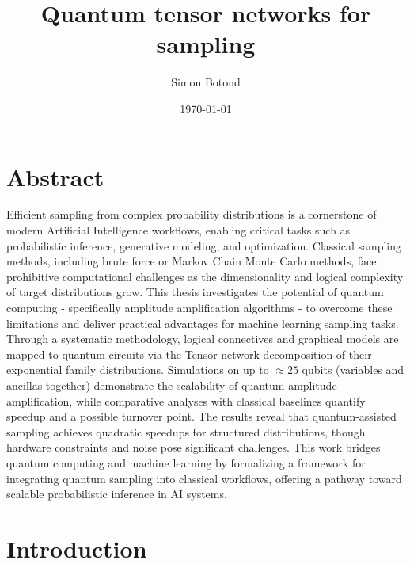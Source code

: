 \documentclass[encoding=utf8,british]{tumphthesis}
\title{Quantum tensor networks for sampling}
\author{Simon Botond}
\date{\today}
\begin{document}

\frontmatter
\maketitle


\mainmatter

\chapter*{Abstract}

Efficient sampling from complex probability distributions is a cornerstone of modern Artificial Intelligence workflows, enabling 
critical tasks such as probabilistic inference, generative modeling, and optimization. Classical sampling methods, 
including brute force or Markov Chain Monte Carlo methods, face prohibitive computational challenges as the 
dimensionality and logical complexity of target distributions grow. This thesis investigates the potential of 
quantum computing - specifically amplitude amplification algorithms - to overcome these limitations and deliver practical 
advantages for machine learning sampling tasks. Through a systematic methodology, logical connectives and graphical 
models are mapped to quantum circuits via the Tensor network decomposition of their exponential family distributions.
Simulations on up to $\approx 25$ qubits (variables and ancillas together) demonstrate the scalability of quantum amplitude amplification, while 
comparative analyses with classical baselines quantify speedup and a possible turnover point. The results reveal that 
quantum-assisted sampling achieves quadratic speedups for structured distributions, though hardware constraints and 
noise pose significant challenges. This work bridges quantum computing and machine learning by formalizing a 
framework for integrating quantum sampling into classical workflows, offering a pathway toward scalable probabilistic 
inference in AI systems.

\tableofcontents

\chapter{Introduction}
\end{document}
